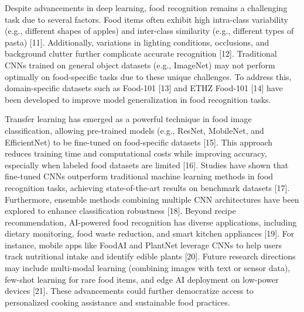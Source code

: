 \documentclass[12pt, a4paper]{article} %
\begin{document}
Despite advancements in deep learning, food recognition remains a challenging task due to several factors. Food items often exhibit high intra-class variability (e.g., different shapes of apples) and inter-class similarity (e.g., different types of pasta) [11]. Additionally, variations in lighting conditions, occlusions, and background clutter further complicate accurate recognition [12]. Traditional CNNs trained on general object datasets (e.g., ImageNet) may not perform optimally on food-specific tasks due to these unique challenges. To address this, domain-specific datasets such as Food-101 [13] and ETHZ Food-101 [14] have been developed to improve model generalization in food recognition tasks.\vspace{1 cm}

Transfer learning has emerged as a powerful technique in food image classification, allowing pre-trained models (e.g., ResNet, MobileNet, and EfficientNet) to be fine-tuned on food-specific datasets [15]. This approach reduces training time and computational costs while improving accuracy, especially when labeled food datasets are limited [16]. Studies have shown that fine-tuned CNNs outperform traditional machine learning methods in food recognition tasks, achieving state-of-the-art results on benchmark datasets [17]. Furthermore, ensemble methods combining multiple CNN architectures have been explored to enhance classification robustness [18].\vspace{1 cm}
Beyond recipe recommendation, AI-powered food recognition has diverse applications, including dietary monitoring, food waste reduction, and smart kitchen appliances [19]. For instance, mobile apps like FoodAI and PlantNet leverage CNNs to help users track nutritional intake and identify edible plants [20]. Future research directions may include multi-modal learning (combining images with text or sensor data), few-shot learning for rare food items, and edge AI deployment on low-power devices [21]. These advancements could further democratize access to personalized cooking assistance and sustainable food practices.\vspace{1 cm}
\end{document}

